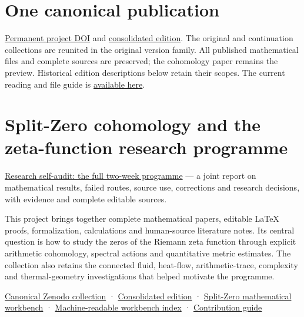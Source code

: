\documentclass[
]{article}
\author{}
\date{}
\begin{document}
\section*{One canonical publication}
\href{https://doi.org/10.5281/zenodo.22678085}{Permanent project DOI} and \href{https://zenodo.org/records/22950644}{consolidated edition}. The original and continuation collections are reunited in the original version family. All published mathematical files and complete sources are preserved; the cohomology paper remains the preview. Historical edition descriptions below retain their scopes. The current reading and file guide is \href{https://github.com/KokunoYumeto/zeta-function-research-reader/blob/main/workbenches/splitzero-tandem/publication-consolidation/README.md}{available here}.


\section{Split-Zero cohomology and the zeta-function research
programme}\label{split-zero-cohomology-and-the-zeta-function-research-programme}

\href{workbenches/splitzero-tandem/research-self-audit/RESEARCH_SELF_AUDIT.md}{Research
self-audit: the full two-week programme} --- a joint report on
mathematical results, failed routes, source use, corrections and
research decisions, with evidence and complete editable sources.

This project brings together complete mathematical papers, editable
LaTeX proofs, formalization, calculations and human-source literature
notes. Its central question is how to study the zeros of the Riemann
zeta function through explicit arithmetic cohomology, spectral actions
and quantitative metric estimates. The collection also retains the
connected fluid, heat-flow, arithmetic-trace, complexity and
thermal-geometry investigations that helped motivate the programme.

\href{https://doi.org/10.5281/zenodo.22678085}{Canonical Zenodo collection} ·
\href{https://zenodo.org/records/22950644}{Consolidated edition} ·
\href{https://github.com/KokunoYumeto/zeta-function-research-reader/blob/main/workbenches/splitzero-tandem/README.md}{Split-Zero
mathematical workbench} ·
\href{https://github.com/KokunoYumeto/zeta-function-research-reader/blob/main/WORKBENCHES.json}{Machine-readable
workbench index} ·
\href{https://github.com/KokunoYumeto/zeta-function-research-reader/blob/main/POLYCLANK_PARTICIPATION.md}{Contribution
guide}
\end{document}
